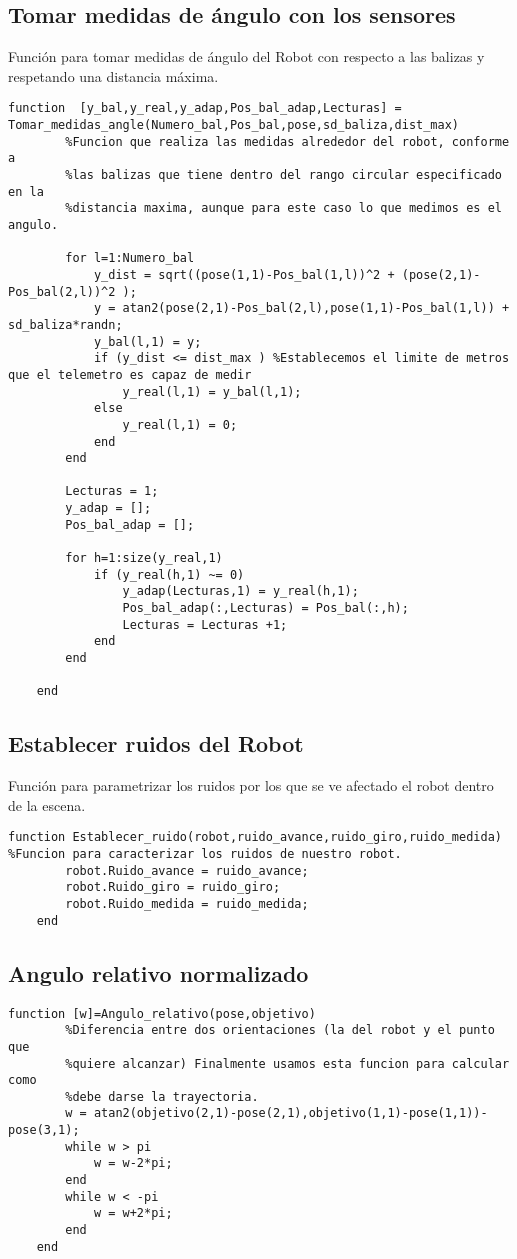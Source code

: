 \subsection{Tomar medidas de ángulo con los sensores}
Función para tomar medidas de ángulo del Robot con respecto a las balizas y respetando una distancia máxima.
\begin{lstlisting}[frame=single]
function  [y_bal,y_real,y_adap,Pos_bal_adap,Lecturas] = Tomar_medidas_angle(Numero_bal,Pos_bal,pose,sd_baliza,dist_max)
        %Funcion que realiza las medidas alrededor del robot, conforme a
        %las balizas que tiene dentro del rango circular especificado en la
        %distancia maxima, aunque para este caso lo que medimos es el angulo.
        
        for l=1:Numero_bal
            y_dist = sqrt((pose(1,1)-Pos_bal(1,l))^2 + (pose(2,1)-Pos_bal(2,l))^2 );
            y = atan2(pose(2,1)-Pos_bal(2,l),pose(1,1)-Pos_bal(1,l)) + sd_baliza*randn;
            y_bal(l,1) = y;
            if (y_dist <= dist_max ) %Establecemos el limite de metros que el telemetro es capaz de medir
                y_real(l,1) = y_bal(l,1);
            else
                y_real(l,1) = 0;
            end
        end
        
        Lecturas = 1;
        y_adap = [];
        Pos_bal_adap = [];
        
        for h=1:size(y_real,1)
            if (y_real(h,1) ~= 0)
                y_adap(Lecturas,1) = y_real(h,1);
                Pos_bal_adap(:,Lecturas) = Pos_bal(:,h);
                Lecturas = Lecturas +1;
            end
        end
            
    end
\end{lstlisting}
\subsection{Establecer ruidos del Robot}
Función para parametrizar los ruidos por los que se ve afectado el robot dentro de la escena.
\begin{lstlisting}[frame=single]
function Establecer_ruido(robot,ruido_avance,ruido_giro,ruido_medida) %Funcion para caracterizar los ruidos de nuestro robot. 
        robot.Ruido_avance = ruido_avance;
        robot.Ruido_giro = ruido_giro;
        robot.Ruido_medida = ruido_medida;
    end
\end{lstlisting}
\subsection{Angulo relativo normalizado}
\begin{lstlisting}[frame=single]
function [w]=Angulo_relativo(pose,objetivo)
        %Diferencia entre dos orientaciones (la del robot y el punto que
        %quiere alcanzar) Finalmente usamos esta funcion para calcular como
        %debe darse la trayectoria.
        w = atan2(objetivo(2,1)-pose(2,1),objetivo(1,1)-pose(1,1))-pose(3,1);
        while w > pi
            w = w-2*pi;
        end
        while w < -pi
            w = w+2*pi;
        end
    end
\end{lstlisting}
